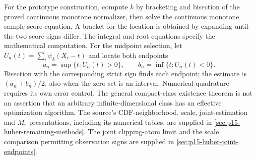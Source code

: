 For the prototype construction, compute \(k\) by bracketing and bisection
of the proved continuous monotone normalizer, then solve the continuous
monotone sample score equation. A bracket for the location is obtained
by expanding until the two score signs differ. The integral and root
equations specify the mathematical computation. For the midpoint
selection, let \(U_n(t)=\sum_i\psi_k(X_i-t)\) and locate both endpoints
\[
 a_n=\sup\{t:U_n(t)>0\},\qquad
 b_n=\inf\{t:U_n(t)<0\}.
\]
Bisection with the corresponding strict sign finds each endpoint;
the estimate is \((a_n+b_n)/2\), also when the zero set is an interval.
Numerical quadrature
requires its own error control.
The general compact-class existence theorem is not an assertion that
an arbitrary infinite-dimensional class has an effective optimization
algorithm. The source's CDF-neighborhood, scale, joint-estimation and
\(M_r\) presentations, including its numerical tables, are supplied
in \cref{sec:p15-huber-remaining-methods}.
The joint clipping-atom limit and the scale comparison permitting
observation signs are supplied in \cref{sec:p15-huber-joint-endpoints}.
